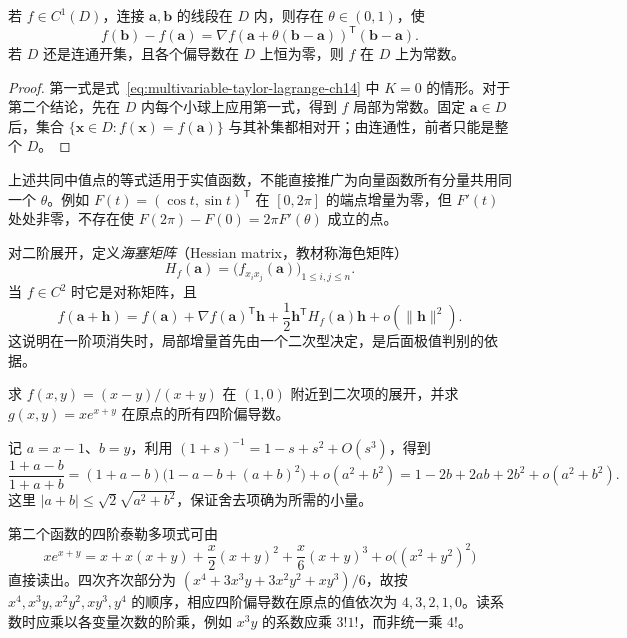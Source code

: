 \begin{corollary}
\label{cor:multivariable-mean-value-ch14}
若 $f\in C^1(D)$，连接 $\boldsymbol a,\boldsymbol b$ 的线段在 $D$ 内，则存在 $\theta\in(0,1)$，使
\[
    f(\boldsymbol b)-f(\boldsymbol a)
    =\nabla f(\boldsymbol a+\theta(\boldsymbol b-\boldsymbol a))^{\mathsf T}
       (\boldsymbol b-\boldsymbol a).
\]
若 $D$ 还是连通开集，且各个偏导数在 $D$ 上恒为零，则 $f$ 在 $D$ 上为常数。
\end{corollary}
\begin{proof}
第一式是式~\eqref{eq:multivariable-taylor-lagrange-ch14} 中 $K=0$ 的情形。对于第二个结论，先在 $D$ 内每个小球上应用第一式，得到 $f$ 局部为常数。固定 $\boldsymbol a\in D$ 后，集合 $\{\boldsymbol x\in D:f(\boldsymbol x)=f(\boldsymbol a)\}$ 与其补集都相对开；由连通性，前者只能是整个 $D$。
\end{proof}

上述共同中值点的等式适用于实值函数，不能直接推广为向量函数所有分量共用同一个 $\theta$。例如 $F(t)=(\cos t,\sin t)^{\mathsf T}$ 在 $[0,2\pi]$ 的端点增量为零，但 $F'(t)$ 处处非零，不存在使 $F(2\pi)-F(0)=2\pi F'(\theta)$ 成立的点。

对二阶展开，定义\emph{海塞矩阵}（Hessian matrix，教材称海色矩阵）
\[
    H_f(\boldsymbol a)=\bigl(f_{x_ix_j}(\boldsymbol a)\bigr)_{1\leq i,j\leq n}.
\]
当 $f\in C^2$ 时它是对称矩阵，且
\begin{equation}
\label{eq:second-order-taylor-peano-ch14}
    f(\boldsymbol a+\boldsymbol h)
    =f(\boldsymbol a)+\nabla f(\boldsymbol a)^{\mathsf T}\boldsymbol h
       +\frac12\boldsymbol h^{\mathsf T}H_f(\boldsymbol a)\boldsymbol h
       +o(\|\boldsymbol h\|^2).
\end{equation}
这说明在一阶项消失时，局部增量首先由一个二次型决定，是后面极值判别的依据。

\begin{example}
\label{ex:multivariable-taylor-by-expansion-ch14}
求 $f(x,y)=(x-y)/(x+y)$ 在 $(1,0)$ 附近到二次项的展开，并求 $g(x,y)=xe^{x+y}$ 在原点的所有四阶偏导数。
\end{example}
\begin{solve}
记 $a=x-1$、$b=y$，利用 $(1+s)^{-1}=1-s+s^2+O(s^3)$，得到
\[
    \frac{1+a-b}{1+a+b}
    =(1+a-b)\bigl(1-a-b+(a+b)^2\bigr)
       +o(a^2+b^2)
    =1-2b+2ab+2b^2+o(a^2+b^2).
\]
这里 $|a+b|\leq\sqrt2\sqrt{a^2+b^2}$，保证舍去项确为所需的小量。

第二个函数的四阶泰勒多项式可由
\[
    xe^{x+y}
    =x+x(x+y)+\frac{x}{2}(x+y)^2+\frac{x}{6}(x+y)^3
       +o\bigl((x^2+y^2)^2\bigr)
\]
直接读出。四次齐次部分为 $(x^4+3x^3y+3x^2y^2+xy^3)/6$，故按 $x^4,x^3y,x^2y^2,xy^3,y^4$ 的顺序，相应四阶偏导数在原点的值依次为 $4,3,2,1,0$。读系数时应乘以各变量次数的阶乘，例如 $x^3y$ 的系数应乘 $3!1!$，而非统一乘 $4!$。
\end{solve}


